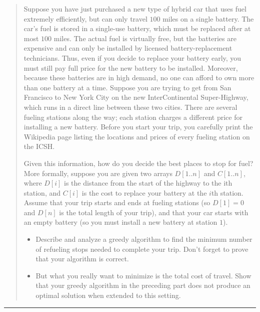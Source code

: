\documentclass[11pt]{article}
\begin{document}

\begin{quote}
Suppose you have just purchased a new type of hybrid car that
  uses fuel extremely efficiently, but can only travel $100$ miles on a
  single battery. The car’s fuel is stored in a single-use battery,
  which must be replaced after at most $100$ miles. The actual fuel is
  virtually free, but the batteries are expensive and can only be
  installed by licensed battery-replacement technicians. Thus, even if
  you decide to replace your battery early, you must still pay full
  price for the new battery to be installed. Moreover, because these
  batteries are in high demand, no one can afford to own more than one
  battery at a time.  Suppose you are trying to get from San Francisco
  to New York City on the new InterContinental Super-Highway, which
  runs in a direct line between these two cities. There are several
  fueling stations along the way; each station charges a different
  price for installing a new battery. Before you start your trip, you
  carefully print the Wikipedia page listing the locations and prices
  of every fueling station on the ICSH.

  Given this information, how do
  you decide the best places to stop for fuel?  More formally, suppose
  you are given two arrays $D[1 .. n]$ and $C[1 .. n]$, where $D[i]$ is the
  distance from the start of the highway to the ith station, and $C[i]$
  is the cost to replace your battery at the $i$th station. Assume that
  your trip starts and ends at fueling stations (so $D[1] = 0$ and $D[n]$
  is the total length of your trip), and that your car starts with an
  empty battery (so you must install a new battery at station $1$).


  \begin{itemize}
    \item   Describe and analyze a greedy algorithm to find the minimum number
  of refueling stops needed to complete your trip. Don’t forget to
  prove that your algorithm is correct.
    \item   But what you really want
  to minimize is the total cost of travel. Show that your greedy
  algorithm in the preceding part does not produce an optimal solution when
  extended to this setting.
  \end{itemize}
\end{quote}
\hrule
\end{document}
